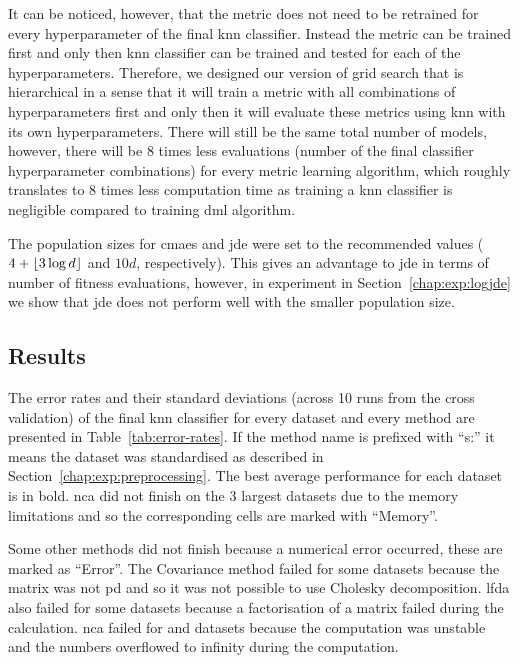 \documentclass[12pt,a4paper]{report}
\begin{document}
It can be noticed, however, that the metric does not need to be retrained for every hyperparameter of the final \ac{knn} classifier. Instead the metric can be trained first and only then \ac{knn} classifier can be trained and tested for each of the hyperparameters. Therefore, we designed our version of grid search that is hierarchical in a sense that it will train a metric with all combinations of hyperparameters first and only then it will evaluate these metrics using \ac{knn} with its own hyperparameters. There will still be the same total number of models, however, there will be 8 times less evaluations (number of the final classifier hyperparameter combinations) for every metric learning algorithm, which roughly translates to 8 times less computation time as training a \ac{knn} classifier is negligible compared to training \ac{dml} algorithm.

The population sizes for \ac{cmaes} and \ac{jde} were set to the recommended values ($4+\lfloor3\log{d}\rfloor$ and $10d$, respectively). This gives an advantage to \ac{jde} in terms of number of fitness evaluations, however, in experiment in Section~\ref{chap:exp:logjde} we show that \ac{jde} does not perform well with the smaller population size.

\subsection{Results}

The error rates and their standard deviations (across 10 runs from the cross validation) of the final \ac{knn} classifier for every dataset and every method are presented in Table~\ref{tab:error-rates}. If the method name is prefixed with ``s:'' it means the dataset was standardised as described in Section~\ref{chap:exp:preprocessing}. The best average performance for each dataset is in bold. \ac{nca} did not finish on the 3 largest datasets due to the memory limitations and so the corresponding cells are marked with ``Memory''.

Some other methods did not finish because a numerical error occurred, these are marked as ``Error''. The Covariance method failed for some datasets because the matrix was not \ac{pd} and so it was not possible to use Cholesky decomposition. \ac{lfda} also failed for some datasets because a factorisation of a matrix failed during the calculation. \ac{nca} failed for  and  datasets because the computation was unstable and the numbers overflowed to infinity during the computation.
\end{document}
